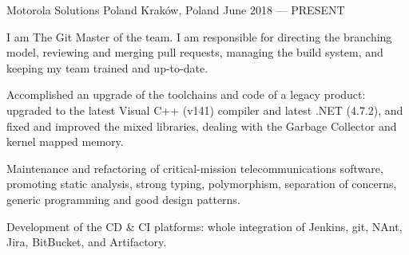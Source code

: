 
\begin{cventries}

    {Motorola Solutions Poland} %
    {Kraków, Poland} %
    {June 2018 --- PRESENT} %
    {
        \begin{cvitems} %
        \item {I am The Git Master of the team. I am responsible for directing the branching model,
                reviewing and merging pull requests, managing the build system, and keeping my team
            trained and up-to-date.}
        \item {Accomplished an upgrade of the toolchains and code of a legacy product: upgraded to
                the latest Visual C++ (v141) compiler and latest {.NET} (4.7.2), and fixed and
            improved the mixed libraries, dealing with the Garbage Collector and kernel mapped memory.}
        \item {Maintenance and refactoring of critical-mission telecommunications software,
                promoting static analysis, strong typing, polymorphism, separation of concerns,
            generic programming and good design patterns.}
        \item {Development of the CD \& CI platforms: whole integration of Jenkins, git, NAnt,
            Jira, BitBucket, and Artifactory.}
        \end{cvitems}
    }


\end{cventries}
